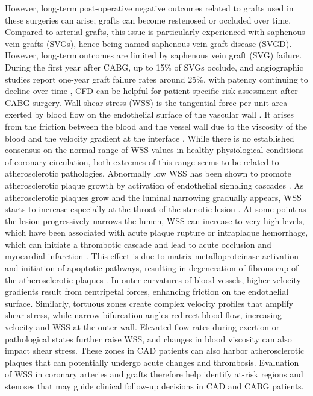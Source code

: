 ﻿\documentclass[12pt,a4paper]{article}
\theoremstyle{definition}
\numberwithin{equation}{section}
\begin{document}
However, long-term post-operative negative outcomes related to grafts used in these surgeries can arise; grafts can become restenosed or occluded over time. Compared to arterial grafts, this issue is particularly experienced with saphenous vein grafts (SVGs), hence being named saphenous vein graft disease (SVGD). However, long-term outcomes are limited by saphenous vein graft (SVG) failure. During the first year after CABG, up to 15\% of SVGs occlude, and angiographic studies report one-year graft failure rates around 25\%, with patency continuing to decline over time \cite{46, 101, 102, 103, 104}, CFD can be helpful for patient-specific risk assessment after CABG surgery. Wall shear stress (WSS) is the tangential force per unit area exerted by blood flow on the endothelial surface of the vascular wall \cite{79}. It arises from the friction between the blood and the vessel wall due to the viscosity of the blood and the velocity gradient at the interface \cite{47}. While there is no established consensus on the normal range of WSS values in healthy physiological conditions of coronary circulation, both extremes of this range seems to be related to atherosclerotic pathologies. Abnormally low WSS has been shown to promote atherosclerotic plaque growth by activation of endothelial signaling cascades \cite{42, 49, 50}. As atherosclerotic plaques grow and the luminal narrowing gradually appears, WSS starts to increase especially at the throat of the stenotic lesion \cite{42, 50}. At some point as the lesion progressively narrows the lumen, WSS can increase to very high levels, which have been  associated with acute plaque rupture or intraplaque hemorrhage, which can initiate a thrombotic cascade and lead to acute occlusion and myocardial infarction \cite{51, 52, 55, 56}. This effect is due to matrix metalloproteinase activation and initiation of apoptotic pathways, resulting in degeneration of fibrous cap of the atherosclerotic plaques \cite{52, 53}. In outer curvatures of blood vessels, higher velocity gradients result from centripetal forces, enhancing friction on the endothelial surface. Similarly, tortuous zones create complex velocity profiles that amplify shear stress, while narrow bifurcation angles redirect blood flow, increasing velocity and WSS at the outer wall. Elevated flow rates during exertion or pathological states further raise WSS, and changes in blood viscosity can also impact shear stress. These zones in CAD patients can also harbor  atherosclerotic plaques that can potentially undergo acute changes and thrombosis. Evaluation of WSS in coronary arteries and grafts therefore help identify at-risk regions and stenoses that may guide clinical follow-up decisions in CAD and CABG patients. 
\end{document}
